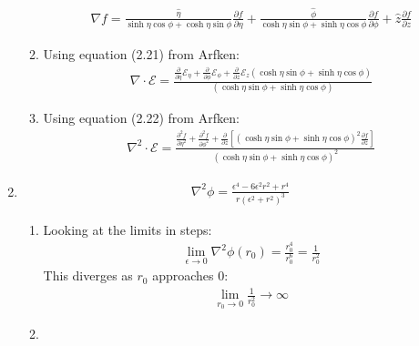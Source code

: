\documentclass[12pt]{article}
\newcommand{\p}[2]{\frac{\partial #1}{\partial #2}}
\begin{document}
\begin{enumerate}
\begin{enumerate}
      \begin{gather*}
        \nabla f=\frac{\hat{\eta}}{\sinh\eta\cos\phi+\cosh\eta\sin\phi}\p{f}{\eta}+
        \frac{\hat{\phi}}{\cosh\eta\sin\phi+\sinh\eta\cos\phi}\p{f}{\phi}+\hat{z}\p{f}{z}
      \end{gather*}
      \item Using equation (2.21) from Arfken:
      \begin{gather*}
        \nabla\cdot\mathcal{E}=\frac{\p{}{\eta}\mathcal{E}_{\eta}+\p{}{\phi}\mathcal{E}_{\phi}+\p{}{z}\mathcal{E}_{z}(\cosh\eta\sin\phi+\sinh\eta\cos\phi)}{(\cosh\eta\sin\phi+\sinh\eta\cos\phi)}
      \end{gather*}
      \item Using equation (2.22) from Arfken:
      \begin{gather*}
        \nabla^2\cdot\mathcal{E}=\frac{\p{^2f}{\eta^2}+\p{^2f}{\phi^2}+\p{}{z}\left[(\cosh\eta\sin\phi+\sinh\eta\cos\phi)^2\p{f}{z}\right]}{(\cosh\eta\sin\phi+\sinh\eta\cos\phi)^2}
      \end{gather*}
    \end{enumerate}
    \item
    \begin{gather*}
      \nabla^2\phi=\frac{\epsilon^4-6\epsilon^2 r^2+r^4}{r(\epsilon^2+r^2)^3}
    \end{gather*}
    \begin{enumerate}
      \item Looking at the limits in steps:
      \begin{align*}
        \lim_{\epsilon\rightarrow0}\nabla^2\phi(r_0)=\frac{r_0^4}{r_0^6}=\frac{1}{r_0^2}
      \end{align*}
      This diverges as $r_0$ approaches 0:
      \begin{align*}
        \lim_{r_0\rightarrow0}\frac{1}{r_0^2}\rightarrow\infty
      \end{align*}
      \item

    \end{enumerate}
  \end{enumerate}
\end{document}
